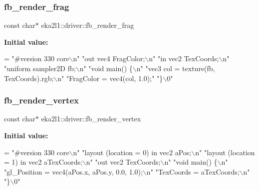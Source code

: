 \subsubsection{\texorpdfstring{fb\+\_\+render\+\_\+frag}{fb\_render\_frag}}
{\footnotesize\ttfamily const char$\ast$ eka2l1\+::driver\+::fb\+\_\+render\+\_\+frag}

{\bfseries Initial value\+:}
\begin{DoxyCode}
= \textcolor{stringliteral}{"#version 330 core\(\backslash\)n"}
            \textcolor{stringliteral}{"out vec4 FragColor;\(\backslash\)n"}
            \textcolor{stringliteral}{"in vec2 TexCoords;\(\backslash\)n"}
            \textcolor{stringliteral}{"uniform sampler2D fb;\(\backslash\)n"}
            \textcolor{stringliteral}{"void main() \{\(\backslash\)n"}
            \textcolor{stringliteral}{"vec3 col = texture(fb, TexCoords).rgb;\(\backslash\)n"}
            \textcolor{stringliteral}{"FragColor = vec4(col, 1.0);"}
            \textcolor{stringliteral}{"\}\(\backslash\)0"}
\end{DoxyCode}
\mbox{\label{namespaceeka2l1_1_1driver_aacfb48df3ed95509badd868bde06df85}} 
\subsubsection{\texorpdfstring{fb\+\_\+render\+\_\+vertex}{fb\_render\_vertex}}
{\footnotesize\ttfamily const char$\ast$ eka2l1\+::driver\+::fb\+\_\+render\+\_\+vertex}

{\bfseries Initial value\+:}
\begin{DoxyCode}
= \textcolor{stringliteral}{"#version 330 core\(\backslash\)n"}
            \textcolor{stringliteral}{"layout (location = 0) in vec2 aPos;\(\backslash\)n"}
            \textcolor{stringliteral}{"layout (location = 1) in vec2 aTexCoords;\(\backslash\)n"}
            \textcolor{stringliteral}{"out vec2 TexCoords;\(\backslash\)n"}
            \textcolor{stringliteral}{"void main() \{\(\backslash\)n"}
            \textcolor{stringliteral}{"gl\_Position = vec4(aPos.x, aPos.y, 0.0, 1.0);\(\backslash\)n"}
            \textcolor{stringliteral}{"TexCoords = aTexCoords;\(\backslash\)n"}
            \textcolor{stringliteral}{"\}\(\backslash\)0"}
\end{DoxyCode}
\mbox{\label{namespaceeka2l1_1_1driver_a9849bf26d5cf593621b50a0edb1b9d16}} 

